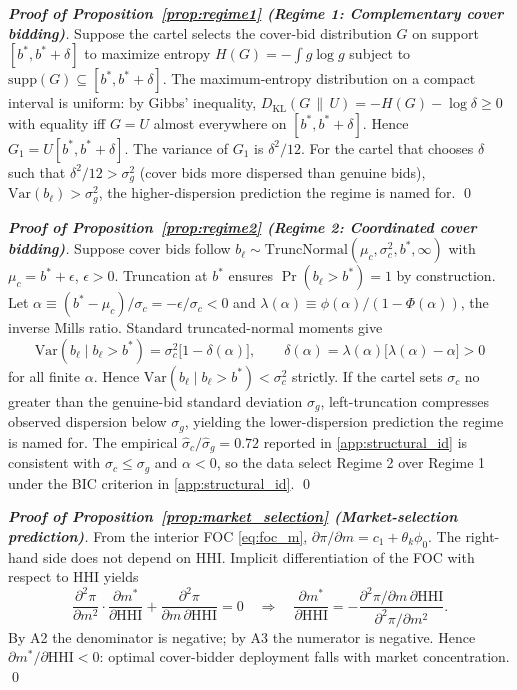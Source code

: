 \begin{proof}[\textbf{Proof of Proposition~\ref{prop:regime1}
(Regime 1: Complementary cover bidding)}]
Suppose the cartel selects the cover-bid distribution $G$ on
support $[b^*, b^* + \delta]$ to maximize entropy
$H(G) = -\int g \log g$ subject to $\mathrm{supp}(G) \subseteq
[b^*, b^* + \delta]$. The maximum-entropy distribution on a
compact interval is uniform: by Gibbs' inequality,
$D_{\mathrm{KL}}(G \,\|\, U) = -H(G) - \log \delta \geq 0$
with equality iff $G = U$ almost everywhere on
$[b^*, b^* + \delta]$. Hence $G_1 = U[b^*, b^* + \delta]$.
The variance of $G_1$ is $\delta^2/12$. For the cartel that
chooses $\delta$ such that $\delta^2/12 > \sigma_g^2$ (cover
bids more dispersed than genuine bids),
$\mathrm{Var}(b_\ell) > \sigma_g^2$, the higher-dispersion
prediction the regime is named for. \qed
\end{proof}

\begin{proof}[\textbf{Proof of Proposition~\ref{prop:regime2}
(Regime 2: Coordinated cover bidding)}]
Suppose cover bids follow
$b_\ell \sim \mathrm{TruncNormal}(\mu_c, \sigma_c^2, b^*, \infty)$
with $\mu_c = b^* + \epsilon$, $\epsilon > 0$. Truncation at
$b^*$ ensures $\Pr(b_\ell > b^*) = 1$ by construction. Let
$\alpha \equiv (b^* - \mu_c)/\sigma_c = -\epsilon/\sigma_c < 0$
and $\lambda(\alpha) \equiv \phi(\alpha)/(1 - \Phi(\alpha))$,
the inverse Mills ratio. Standard truncated-normal moments
\citep[][p.\ 156]{imbens2015causal} give
\[
  \mathrm{Var}(b_\ell \mid b_\ell > b^*) =
  \sigma_c^2 \bigl[1 - \delta(\alpha)\bigr], \qquad
  \delta(\alpha) = \lambda(\alpha)\bigl[\lambda(\alpha) - \alpha\bigr] > 0
\]
for all finite $\alpha$. Hence
$\mathrm{Var}(b_\ell \mid b_\ell > b^*) < \sigma_c^2$ strictly.
If the cartel sets $\sigma_c$ no greater than the genuine-bid
standard deviation $\sigma_g$, left-truncation compresses
observed dispersion below $\sigma_g$, yielding the
lower-dispersion prediction the regime is named for. The
empirical $\hat{\sigma}_c / \hat{\sigma}_g = 0.72$ reported in
\ref{app:structural_id} is consistent with $\sigma_c \leq \sigma_g$
and $\alpha < 0$, so the data select Regime 2 over Regime 1
under the BIC criterion in \ref{app:structural_id}. \qed
\end{proof}

\begin{proof}[\textbf{Proof of Proposition~\ref{prop:market_selection}
(Market-selection prediction)}]
From the interior FOC \eqref{eq:foc_m},
$\partial \pi / \partial m = c_1 + \theta_k \phi_0$. The
right-hand side does not depend on $\mathrm{HHI}$. Implicit
differentiation of the FOC with respect to $\mathrm{HHI}$ yields
\[
  \frac{\partial^2 \pi}{\partial m^2} \cdot
  \frac{\partial m^*}{\partial \mathrm{HHI}}
  + \frac{\partial^2 \pi}{\partial m \, \partial \mathrm{HHI}} = 0
  \quad\Longrightarrow\quad
  \frac{\partial m^*}{\partial \mathrm{HHI}} =
  -\frac{\partial^2 \pi / \partial m \, \partial \mathrm{HHI}}
        {\partial^2 \pi / \partial m^2}.
\]
By A2 the denominator is negative; by A3 the numerator is
negative. Hence $\partial m^*/\partial \mathrm{HHI} < 0$:
optimal cover-bidder deployment falls with market
concentration. \qed
\end{proof}

